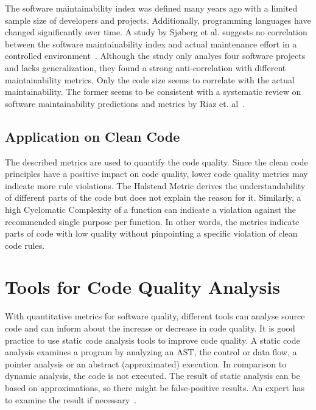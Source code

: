 The software maintainability index was defined many years ago with a limited sample size of developers and projects. Additionally, programming languages have changed significantly over time. A study by Sjøberg et al. suggests no correlation between the software maintainability index and actual maintenance effort in a controlled environment~\cite{sjoberg_questioning_nodate}. Although the study only analyes four software projects and lacks generalization, they found a strong anti-correlation with different maintainability metrics. Only the code size seems to correlate with the actual maintainability. The former seems to be consistent with a systematic review on software maintainability predictions and metrics by Riaz et. al~\cite{riaz_systematic_2009}.

\subsection{Application on Clean Code}
The described metrics are used to quantify the code quality. Since the clean code principles have a positive impact on code quality, lower code quality metrics may indicate more rule violations. The Halstead Metric derives the understandability of different parts of the code but does not explain the reason for it. Similarly, a high Cyclomatic Complexity of a function can indicate a violation against the recommended single purpose per function. In other words, the metrics indicate parts of code with low quality without pinpointing a specific violation of clean code rules. 


\section{Tools for Code Quality Analysis}\label{sec:tool_comparison}
With quantitative metrics for software quality, different tools can analyse source code and can inform about the increase or decrease in code quality. It is good practice to use static code analysis tools to improve code quality. A static code analysis examines a program by analyzing an AST, the control or data flow, a pointer analysis or an abstract (approximated) execution. In comparison to dynamic analysis, the code is not executed. The result of static analysis can be based on approximations, so there might be false-positive results. An expert has to examine the result if necessary~\cite{prahofer_static_2017}.

